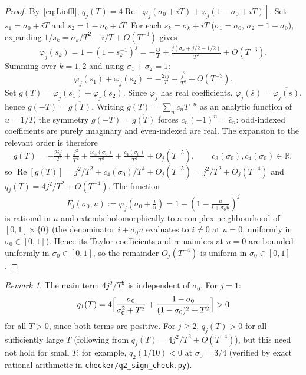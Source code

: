 \documentclass[12pt]{amsart}
\theoremstyle{definition}
\theoremstyle{remark}
\newtheorem{remark}[definition]{Remark}
\theoremstyle{plain}
\newcommand{\re}{\operatorname{Re}}
\newcommand{\RR}{\mathbb{R}}
\begin{document}
\begin{proof}
By~\eqref{eq:Lioffl},
$q_j(T) = 4\re[\varphi_j(\sigma_0+iT) + \varphi_j(1-\sigma_0+iT)]$.
Set $s_1 = \sigma_0+iT$ and $s_2 = 1-\sigma_0+iT$.
For each $s_k = \sigma_k + iT$ ($\sigma_1=\sigma_0$, $\sigma_2=1-\sigma_0$),
expanding $1/s_k = \sigma_k/T^2 - i/T + O(T^{-3})$ gives
\[
  \varphi_j(s_k) = 1 - (1-s_k^{-1})^j
  = -\tfrac{ij}{T} + \tfrac{j(\sigma_k + j/2 - 1/2)}{T^2} + O(T^{-3}).
\]
Summing over $k=1,2$ and using $\sigma_1+\sigma_2 = 1$:
\[
  \varphi_j(s_1) + \varphi_j(s_2)
  = -\tfrac{2ij}{T} + \tfrac{j^2}{T^2} + O(T^{-3}).
\]
Set $g(T) = \varphi_j(s_1)+\varphi_j(s_2)$.
Since $\varphi_j$ has real coefficients, $\varphi_j(\bar{s}) = \overline{\varphi_j(s)}$,
hence $g(-T) = \overline{g(T)}$.  Writing $g(T) = \sum_n c_n T^{-n}$ as an analytic
function of $u=1/T$, the symmetry $g(-T)=\overline{g(T)}$ forces
$c_n(-1)^n = \bar c_n$: odd-indexed coefficients are purely imaginary and
even-indexed are real.  The expansion to the relevant order is therefore
\[
  g(T) = -\tfrac{2ij}{T} + \tfrac{j^2}{T^2} + \tfrac{ic_3(\sigma_0)}{T^3} + \tfrac{c_4(\sigma_0)}{T^4}
  + O_j(T^{-5}), \qquad c_3(\sigma_0), c_4(\sigma_0) \in \RR,
\]
so $\re[g(T)] = j^2/T^2 + c_4(\sigma_0)/T^4 + O_j(T^{-5}) = j^2/T^2 + O_j(T^{-4})$
and $q_j(T) = 4j^2/T^2 + O(T^{-4})$.
The function
\[
  F_j(\sigma_0,u)
  := \varphi_j\!\left(\sigma_0+\tfrac{i}{u}\right)
  = 1-\left(1-\tfrac{u}{i+\sigma_0 u}\right)^j
\]
is rational in $u$ and extends holomorphically to a complex
neighbourhood of $[0,1]\times\{0\}$ (the denominator $i+\sigma_0 u$
evaluates to $i\ne 0$ at $u=0$, uniformly in $\sigma_0\in[0,1]$).
Hence its Taylor coefficients and remainders at $u=0$ are bounded
uniformly in $\sigma_0\in[0,1]$, so the remainder $O_j(T^{-4})$ is
uniform in $\sigma_0\in[0,1]$.
\end{proof}

\begin{remark}
\label{rem:q1sign}
The main term $4j^2/T^2$ is independent of $\sigma_0$.  For $j=1$:
\[
  q_1(T) = 4\Bigl[\frac{\sigma_0}{\sigma_0^2+T^2}
            + \frac{1-\sigma_0}{(1-\sigma_0)^2+T^2}\Bigr] > 0
\]
for all $T>0$, since both terms are positive.
For $j\geq 2$, $q_j(T)>0$ for all sufficiently large $T$ (following from
$q_j(T) = 4j^2/T^2 + O(T^{-4})$), but this need not hold for small $T$:
for example, $q_2(1/10) < 0$ at $\sigma_0 = 3/4$
(verified by exact rational arithmetic in
\texttt{checker/q2\_sign\_check.py}).
\end{remark}

\end{document}
